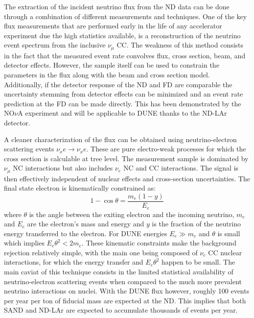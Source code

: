 The extraction of the incident neutrino flux from the ND data can be done through a combination of different measurements and techniques. One of the key flux measurements that are performed early in the life of any accelerator experiment due the high statistics available, is a reconstruction of the neutrino event spectrum from the inclusive $\nu_\mu$ CC. The weakness of this method consists in the fact that the measured event rate convolves flux, cross section, beam, and detector effects. However, the sample itself can be used to constrain the parameters in the flux along with the beam and cross section model. Additionally, if the detector response of the ND and FD are comparable the uncertainty stemming from detector effects can be minimized and an event rate prediction at the FD can be made directly. This has been demonstrated by the NO$\nu$A experiment \cite{NOvA:2019cyt} and will be applicable to DUNE thanks to the ND-LAr detector.

A cleaner characterization of the flux can be obtained using neutrino-electron scattering events $\nu_x e \rightarrow \nu_x e$. These are pure electro-weak processes for which the cross section is calculable at tree level. The measurement sample is dominated by $\nu_\mu$ NC interactions but also includes $\nu_e$ NC and CC interactions. The signal is then effectively independent of nuclear effects and cross-section uncertainties. The final state electron is kinematically constrained as: 
\begin{equation}
    1-\cos{\theta}=\frac{m_e(1-y)}{E_e}
\end{equation}
where $\theta$ is the angle between the exiting electron and the incoming neutrino, $m_e$ and $E_e$ are the electron's mass and energy and $y$ is the fraction of the neutrino energy transferred to the electron. For DUNE energies $E_e\gg m_e$ and $\theta$ is small which implies $E_e\theta^2<2m_e$. These kinematic constraints make the background rejection relatively simple, with the main one being composed of $\nu_e$ CC nuclear interactions, for which the energy transfer and $E_e\theta^2$ happen to be small. The main caviat of this technique consists in the limited statistical availability of neutrino-electron scattering events when compared to the much more prevalent neutrino interactions on nuclei. With the DUNE flux however, roughly 100 events per year per ton of fiducial mass are expected at the ND. This implies that both SAND and ND-LAr are expected to accumulate thousands of events per year.

